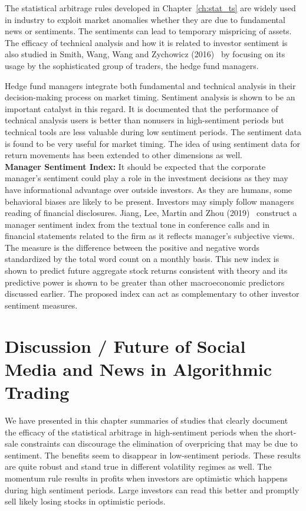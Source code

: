 The statistical arbitrage rules developed in Chapter~\ref{ch:stat_ts} are widely used in industry to exploit market anomalies whether they are due to fundamental news or sentiments. The sentiments can lead to temporary mispricing of assets. The efficacy of technical analysis and how it is related to investor sentiment is also studied in Smith, Wang, Wang and Zychowicz (2016)~\cite{smithwangwangzy16} by focusing on its usage by the sophisticated group of traders, the hedge fund managers. 


Hedge fund managers integrate both fundamental and technical analysis in their decision-making process on market timing. Sentiment analysis is shown to be an important catalyst in this regard. It is documented that the performance of technical analysis users is better than nonusers in high-sentiment periods but technical tools are less valuable during low sentiment periods. The sentiment data is found to be very useful for market timing. The idea of using sentiment data for return movements has been extended to other dimensions as well. \\


\noindent\textbf{Manager Sentiment Index:} It should be expected that the corporate manager's sentiment could play a role in the investment decisions as they may have informational advantage over outside investors. As they are humans, some behavioral biases are likely to be present. Investors may simply follow managers reading of financial disclosures. Jiang, Lee, Martin and Zhou (2019)~\cite{jianleemartin} construct a manager sentiment index from the textual tone in conference calls and in financial statements related to the firm as it reflects manager's subjective views. The measure is the difference between the positive and negative words standardized by the total word count on a monthly basis. This new index is shown to predict future aggregate stock returns consistent with theory and its predictive power is shown to be greater than other macroeconomic predictors discussed earlier. The proposed index can act as complementary to other investor sentiment measures. 



\section{Discussion / Future of Social Media and News in Algorithmic Trading}

We have presented in this chapter summaries of studies that clearly document the efficacy of the statistical arbitrage in high-sentiment periods when the short-sale constraints can discourage the elimination of overpricing that may be due to sentiment. The benefits seem to disappear in low-sentiment periods. These results are quite robust and stand true in different volatility regimes as well. The momentum rule results in profits when investors are optimistic which happens during high sentiment periods. Large investors can read this better and promptly sell likely losing stocks in optimistic periods.


